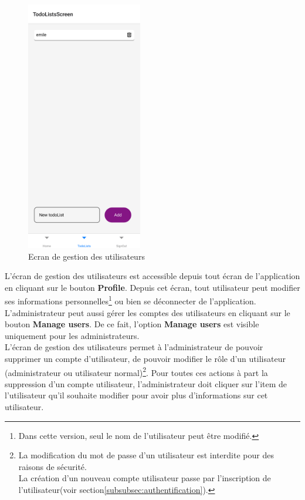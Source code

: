 \documentclass[12pt]{article}
\begin{document}
        \begin{figure}[H]
            \centering
            \includegraphics[width=0.45\textwidth]{images/taskList}
            \caption{Ecran de gestion des utilisateurs}
            \label{fig:gestion-utilisateurs}
        \end{figure}

        L'écran de gestion des utilisateurs est accessible depuis tout écran de l'application en cliquant sur le bouton \textbf{Profile}.
        Depuis cet écran, tout utilisateur peut modifier ses informations personnelles\footnote{Dans cette version, seul le nom de l'utilisateur peut être modifié.} ou bien se déconnecter de l'application.
        L'administrateur peut aussi gérer les comptes des utilisateurs en cliquant sur le bouton \textbf{Manage users}. De ce fait, l'option
        \textbf{Manage users} est visible uniquement pour les administrateurs.\\
        L'écran de gestion des utilisateurs permet à l'administrateur de pouvoir supprimer un compte d'utilisateur,
        de pouvoir modifier le rôle d'un utilisateur (administrateur ou utilisateur normal)\footnote{La modification du mot de passe d'un utilisateur est interdite pour des raisons de sécurité.\\
        La création d'un nouveau compte utilisateur passe par l'inscription de l'utilisateur(voir section\ref{subsubsec:authentification}).}.
        Pour toutes ces actions à part la suppression d'un compte utilisateur, l'administrateur doit cliquer sur l'item de l'utilisateur
        qu'il souhaite modifier pour avoir plus d'informations sur cet utilisateur.\\
\end{document}
